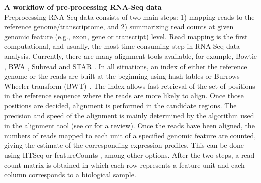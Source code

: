 \textbf{A workflow of pre-processing RNA-Seq data}\\
Preprocessing RNA-Seq data consists of two main steps: 1) mapping reads to the reference genome/transcriptome, and 2) summarizing read counts at given genomic feature (e.g., exon, gene or transcript) level. Read mapping is the first computational, and usually, the most time-consuming step in RNA-Seq data analysis. Currently, there are many alignment tools available, for example, Bowtie \citep{langmead2012fast,langmead2009ultrafast}, BWA \citep{li2013aligning,li2009fast}, Subread \citep{shi2013subread} and STAR \citep{dobin2013star}. In all situations, an index of either the reference genome or the reads are built at the beginning using hash tables or Burrows-Wheeler transform (BWT) \citep{burrows1994block}. The index allows fast retrieval of the set of positions in the reference sequence where the reads are more likely to align. Once those positions are decided, alignment is performed in the candidate regions. The precision and speed of the alignment is mainly determined by the algorithm used in the alignment tool (see \citep{hatem2013benchmarking} or \cite{li2010survey} for a review). Once the reads have been aligned, the numbers of reads mapped to each unit of a specified genomic feature are counted, giving the estimate of the corresponding expression profiles. This can be done using HTSeq \cite{anders2010htseq} or featureCounts \citep{liao2013featurecounts}, among other options. After the two steps, a read count matrix is obtained in which each row represents a feature unit and each column corresponds to a biological sample. 

